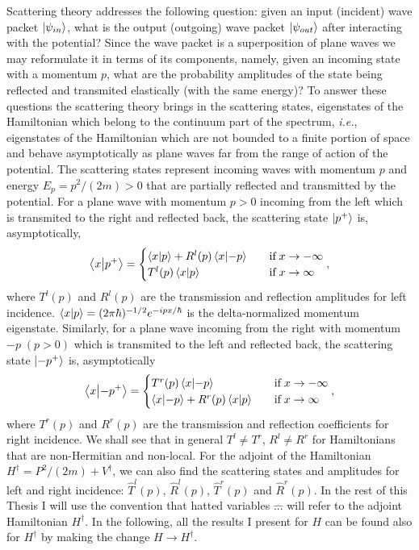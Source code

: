 Scattering theory addresses the following question: given an input (incident) wave packet $\ket{\psi_{in}}$, what is the output (outgoing) wave packet $\ket{\psi_{out}}$ after interacting with the potential? Since the wave packet is a superposition of plane waves we may reformulate it in terms of its components, namely, given an incoming state with a momentum $p$, what are the probability amplitudes of the state being reflected and transmited elastically (with the same energy)? To answer these questions the scattering theory brings in the scattering states, eigenstates of the Hamiltonian which belong to the continuum part of the spectrum, \textit{i.e.}, eigenstates of the Hamiltonian which are not bounded to a finite portion of space and behave asymptotically as plane waves far from the range of action of the potential. The scattering states represent incoming waves with momentum $p$ and energy $E_p = p^2/(2m)>0$ that are partially reflected and transmitted by the potential. For a plane wave with momentum $p>0$ incoming from the left which is transmited to the right and reflected back, the scattering state $\ket{p^+}$ is, asymptotically,
%
\begin{equation}
  \braket{x}{p^+} =
  \begin{cases}
    \braket{x}{p} + R^l(p)\braket{x}{-p} \quad &\text{if}\; x \to -\infty
    \\
    T^l(p) \braket{x}{p} \quad &\text{if}\; x \to \infty
  \end{cases},
  \label{eq:chapter1_leftState}
\end{equation}
%
where $T^l(p)$ and $R^l(p)$ are the transmission and reflection amplitudes for left incidence. $\braket{x}{p} = (2\pi\hbar)^{-1/2} e^{-i p x /\hbar} $ is the delta-normalized momentum eigenstate. Similarly, for a plane wave incoming from the right with momentum $-p \;(p>0)$ which is transmited to the left and reflected back, the scattering state $\ket{-p^+}$ is, asymptotically
%
\begin{equation}
  \braket{x}{-p^+} =
  \begin{cases}
    T^r(p) \braket{x}{-p} \quad &\text{if}\; x \to -\infty
    \\
    \braket{x}{-p} + R^r(p)\braket{x}{p} \quad &\text{if}\; x \to \infty
  \end{cases},
  \label{eq:chapter1_rightState}
\end{equation}
%
where $T^r(p)$ and $R^r(p)$ are the transmission and reflection coefficients for right incidence. We shall see that in general $T^l\neq T^r$, $R^l\neq R^r$ for Hamiltonians that are non-Hermitian and non-local. For the adjoint of the Hamiltonian $H^\dagger = P^2/(2m) + V^\dagger$, we can also find the scattering states and amplitudes for left and right incidence: $\widehat{T}^l(p)$, $\widehat{R}^l(p)$, $\widehat{T}^r(p)$ and $\widehat{R}^r(p)$. In the rest of this Thesis I will use the convention that hatted variables $\widehat{...}$ will refer to the adjoint Hamiltonian $H^\dagger$. In the following, all the results I present for $H$ can be found also for $H^\dagger$ by making the change $H \to H^\dagger$.


